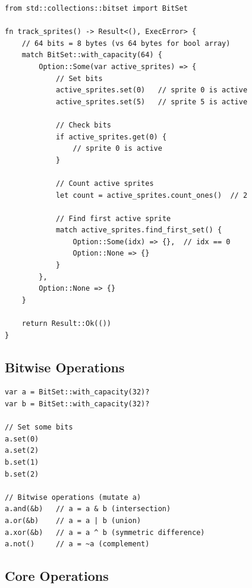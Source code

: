\begin{lstlisting}
from std::collections::bitset import BitSet

fn track_sprites() -> Result<(), ExecError> {
    // 64 bits = 8 bytes (vs 64 bytes for bool array)
    match BitSet::with_capacity(64) {
        Option::Some(var active_sprites) => {
            // Set bits
            active_sprites.set(0)   // sprite 0 is active
            active_sprites.set(5)   // sprite 5 is active

            // Check bits
            if active_sprites.get(0) {
                // sprite 0 is active
            }

            // Count active sprites
            let count = active_sprites.count_ones()  // 2

            // Find first active sprite
            match active_sprites.find_first_set() {
                Option::Some(idx) => {},  // idx == 0
                Option::None => {}
            }
        },
        Option::None => {}
    }

    return Result::Ok(())
}
\end{lstlisting}

\subsection{Bitwise Operations}

\begin{lstlisting}
var a = BitSet::with_capacity(32)?
var b = BitSet::with_capacity(32)?

// Set some bits
a.set(0)
a.set(2)
b.set(1)
b.set(2)

// Bitwise operations (mutate a)
a.and(&b)   // a = a & b (intersection)
a.or(&b)    // a = a | b (union)
a.xor(&b)   // a = a ^ b (symmetric difference)
a.not()     // a = ~a (complement)
\end{lstlisting}

\subsection{Core Operations}

